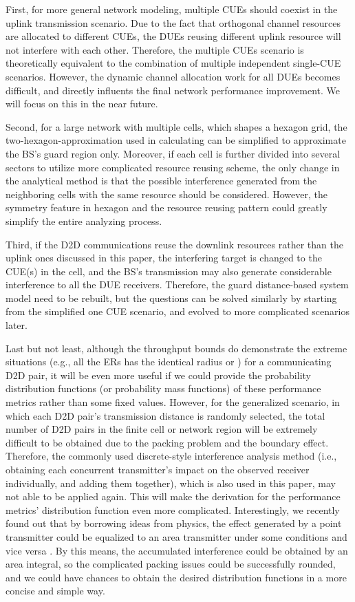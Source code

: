 \documentclass[journal, 10pt]{IEEEtran}
\begin{document}
First, for more general network modeling, multiple CUEs should coexist
in the uplink transmission scenario. Due to the fact that orthogonal
channel resources are allocated to different CUEs, the DUEs reusing
different uplink resource will not interfere with each other.
Therefore, the multiple CUEs scenario is theoretically equivalent to
the combination of multiple independent single-CUE scenarios. However,
the dynamic channel allocation work for all DUEs becomes difficult,
and directly influents the final network performance improvement. We
will focus on this in the near future. 

Second, for a large network with multiple cells, which shapes a
hexagon grid, the two-hexagon-approximation used in calculating
 can be simplified to approximate the BS's guard region
only. Moreover, if each cell is further divided into several sectors
to utilize more complicated resource reusing scheme, the only change
in the analytical method is that the possible interference generated
from the neighboring cells with the same resource should be
considered. However, the symmetry feature in hexagon and the resource
reusing pattern could greatly simplify the entire analyzing process.
 
Third, if the D2D communications reuse the downlink resources rather
than the uplink ones discussed in this paper, the interfering target
is changed to the CUE(s) in the cell, and the BS's transmission may
also generate considerable interference to all the DUE receivers.
Therefore, the guard distance-based system model need to be rebuilt,
but the questions can be solved similarly by starting from the
simplified one CUE scenario, and evolved to more complicated scenarios
later.  


Last but not least, although the throughput bounds do demonstrate the
extreme situations (e.g., all the ERs has the identical radius
 or ) for a communicating D2D
pair, it will be even more useful if we could provide the probability
distribution functions (or probability mass functions) of these
performance metrics rather than some fixed values. However, for the
generalized scenario, in which each D2D pair's transmission distance
 is randomly selected, the total number of D2D pairs
in the finite cell or network region will be extremely difficult to be
obtained due to the packing problem and the boundary effect.
Therefore, the commonly used discrete-style interference analysis
method (i.e., obtaining each concurrent transmitter's impact on the
observed receiver individually, and adding them together), which is
also used in this paper, may not able to be applied again. This will
make the derivation for the performance metrics' distribution function
even more complicated. Interestingly, we recently found out that by
borrowing ideas from physics, the effect generated by a point
transmitter could be equalized to an area transmitter under some
conditions and vice versa \cite{Ni1406:Power}. By this means, the
accumulated interference could be obtained by an area integral, so the
complicated packing issues could be successfully rounded, and we could
have chances to obtain the desired distribution functions in a more
concise and simple way.
\end{document}
